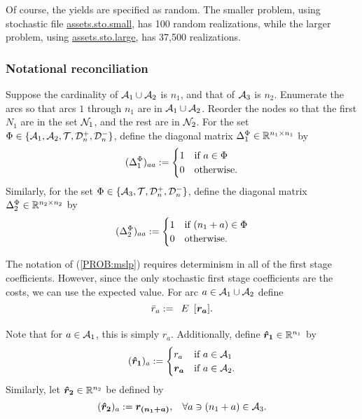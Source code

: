 Of course, the yields are specified as random.  The smaller problem, using stochastic file \url{assets.sto.small}, has 100 random realizations, while the larger problem, using \url{assets.sto.large}, has 37,500 realizations.


\subsubsection{Notational reconciliation}
Suppose the cardinality of ${\cal A}_1 \cup {\cal A}_2$ is $n_1$, and that of ${\cal A}_3$ is $n_2$.  Enumerate the arcs so that arcs $1$ through $n_1$ are in ${\cal A}_1 \cup {\cal A}_2$.  Reorder the nodes so that the first $N_1$ are in the set ${\cal N}_1$, and the rest are in ${\cal N}_2$.  For the set $\Phi \in \{{\cal A}_1, {\cal A}_2, {\cal T}, {\cal D}_n^+, {\cal D}_n^-\}$, define the diagonal matrix $\Delta_1^\Phi \in {\mathbb R}^{n_1 \times n_1}$ by
\begin{equation*}
(\Delta_1^{\Phi})_{aa} := 
\begin{cases}
	1	&	\text{if $a \in \Phi$}\\
	0	&	\text{otherwise.}
\end{cases}
\end{equation*}
Similarly, for the set $\Phi \in \{{\cal A}_3, {\cal T}, {\cal D}_n^+, {\cal D}_n^-\}$, define the diagonal matrix $\Delta_2^\Phi \in {\mathbb R}^{n_2 \times n_2}$ by
\begin{equation*}
(\Delta_2^{\Phi})_{aa} := 
\begin{cases}
	1	&	\text{if $(n_1 + a) \in \Phi$}\\
	0	&	\text{otherwise.}
\end{cases}
\end{equation*}

The notation of (\ref{PROB:mslp}) requires determinism in all of the first stage coefficients.  However, since the only stochastic first stage coefficients are the costs, we can use the expected value.  For arc $a \in {\cal A}_1 \cup {\cal A}_2$ define
\begin{equation*}
\bar{r}_a \assign \expect[]{\left[\rand{r_a}\right]}.
\end{equation*}
Note that for $a \in {\cal A}_1$, this is simply $r_a$.  Additionally,  define $\mathbf{\boldsymbol{\hat{r}_1}} \in {\mathbb R}^{n_1}$ by
\begin{equation*}
(\mathbf{\boldsymbol{\hat{r}_1}})_a := 
\begin{cases}
	r_a	&	\text{if $a \in {\cal A}_1$}\\
	\mathbf{\boldsymbol{r_a}}	&	\text{if $a \in {\cal A}_2$.}
\end{cases}
\end{equation*}
Similarly, let $\mathbf{\boldsymbol{\hat{r}_2}} \in {\mathbb R}^{n_2}$ be defined by
\begin{equation*}
(\mathbf{\boldsymbol{\hat{r}_2}})_a := \mathbf{\boldsymbol{r_{(n_1 + a)}}},\hspace{3mm}\forall a \ni (n_1 + a)\in {\cal A}_3.
\end{equation*}

